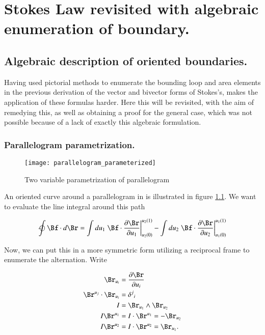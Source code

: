 
\chapter{Stokes Law revisited with algebraic enumeration of boundary.}\label{chap:PJStokes2}
\date{Sept 27, 2008.  stokesRevisited.tex}
\section{Algebraic description of oriented boundaries. }

Having used pictorial methods to enumerate the bounding loop and area elements 
in the previous derivation
of the vector and bivector forms of Stokes's, makes the application
of these formulas harder.  Here this will be revisited, with the aim of remedying this, as well as
obtaining a proof for the general case, which was not possible because of a lack of exactly this
algebraic formulation.

\subsection{Parallelogram parametrization. }

\begin{figure}[htp]
\centering
\texttt{[image: parallelogram\_parameterized]}
\caption{Two variable parametrization of  parallelogram}\label{fig:parallelogram}
\end{figure}

An oriented curve around a parallelogram in  is illustrated in figure 
\ref{fig:parallelogram}.  We want to evaluate the line integral around this
path

\begin{align}\label{eqn:stokesR:lineprep}
\ointclockwise \Bf \cdot d\Br
&=
\int du_1 \left.{\Bf \cdot \PD{u_1}{\Br} }\right\vert_{u_2(0)}^{u_2(1)}
-\int du_2 \left.{\Bf \cdot \PD{u_2}{\Br} }\right\vert_{u_1(0)}^{u_1(1)} \\
\end{align}

Now, we can put this in a more symmetric form utilizing a reciprocal 
frame to enumerate the alternation.  Write

\begin{align*}
\Br_{u_i} &= \PD{u_i}{\Br} \\
\Br^{u_j} \cdot \Br_{u_i} &= {\delta^j}_i \\
I &= \Br_{u_1} \wedge \Br_{u_2} \\
I \Br^{u_1} &=
I \cdot \Br^{u_1} =
- \Br_{u_2} \\
I \Br^{u_2} &=
I \cdot \Br^{u_2} =
 \Br_{u_1}.
\end{align*}

